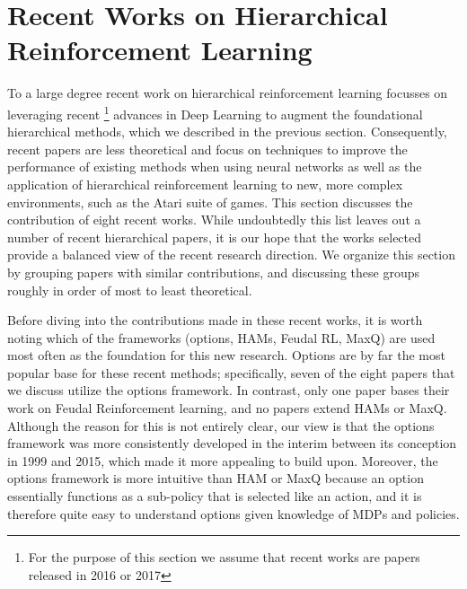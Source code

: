 \section{Recent Works on Hierarchical Reinforcement Learning}

To a large degree recent work on hierarchical reinforcement learning focusses on leveraging recent
\footnote{For the purpose of this section we assume that recent works are papers released in 2016 or 2017}
advances in Deep Learning to augment the foundational hierarchical methods, which we described in the previous section.
Consequently, recent papers are less theoretical and focus on techniques to improve the performance
of existing methods when using neural networks as well as the application of hierarchical reinforcement learning
to new, more complex environments, such as the Atari suite of games.
This section discusses the contribution of eight recent works. While undoubtedly this list leaves out a number
of recent hierarchical papers, it is our hope that the works selected provide a balanced view of the recent
research direction. We organize this section by grouping papers with similar contributions, and discussing
these groups roughly in order of most to least theoretical.

Before diving into the contributions made in these recent works, it is worth noting which of the frameworks
(options, HAMs, Feudal RL, MaxQ) are used most often as the foundation for this new research.
Options are by far the most popular base for these recent methods; specifically, seven of the eight
papers that we discuss utilize the options framework. In contrast, only one paper bases their work
on Feudal Reinforcement learning, and no papers extend HAMs or MaxQ. Although the reason for this is
not entirely clear, our view is that the options framework was more consistently developed in the interim
between its conception in 1999 and 2015, which made it more appealing to build upon. Moreover, the options
framework is more intuitive than HAM or MaxQ because an option essentially functions as a sub-policy that is
selected like an action, and it is therefore quite easy to understand options given knowledge of MDPs and policies.

